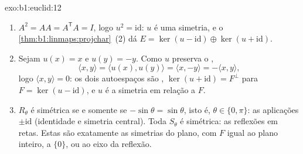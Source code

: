 \begin{solution}{exo:b1:euclid:12}
\begin{enumerate}
  \item $A^2 = A A = A^{\mathsf T} A = I$, logo $u^2 =
        \mathrm{id}$: $u$ é uma simetria, e o \cref{thm:b1:linmaps:projchar}~(2) dá
        $E = \ker(u -
        \mathrm{id}) \oplus \ker(u + \mathrm{id})$.
  \item Sejam $u(x) = x$ e $u(y) = -y$. Como $u$ preserva o ,
        \[
        \langle x, y\rangle = \langle u(x), u(y)\rangle
        = \langle x, -y\rangle = -\langle x, y\rangle ,
        \]
        logo $\langle x, y\rangle = 0$: os dois autoespaços são , $\ker(u + \mathrm{id}) = F^\perp$ para
        $F =
        \ker(u - \mathrm{id})$, e $u$ é a simetria  em relação a $F$.
  \item $R_\theta$ é simétrica se e somente se $-\sin\theta = \sin\theta$, isto é, $\theta \in \{0, \pi\}$: as
        aplicações $\pm\mathrm{id}$ (identidade e simetria central). Toda $S_\theta$
        é simétrica: as reflexões em retas. Estas são exatamente as
        simetrias  do plano, com $F$ igual ao plano
        inteiro, a $\{0\}$, ou ao eixo da reflexão.
\end{enumerate}
\end{solution}

